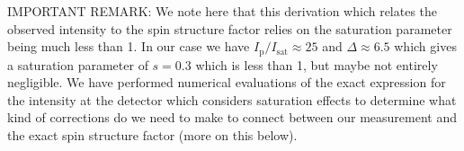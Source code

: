\documentclass[11pt,letter]{article}
\newcommand{\bv}[1]{\ensuremath{\bm{#1}}}
\newcommand{\dsig}[1]{\ensuremath{ \frac{ d\,\sigma_{#1} }{d\,\Omega} }}
\begin{document}
IMPORTANT REMARK:   We note here that this derivation which relates the
observed intensity to the spin structure factor relies on the saturation
parameter being much less than 1.   In our case we have
$I_{\mathrm{p}}/I_{\mathrm{sat}}\approx 25$ and $\Delta\approx 6.5$ which gives a saturation
parameter of $s=0.3$ which is less than 1, but maybe not entirely
negligible. We have performed numerical evaluations of the exact
expression for the intensity at the detector which considers saturation
effects to determine what kind of corrections do we need to make to
connect between our measurement and
the exact spin structure factor (more on this below). 

\end{document}
